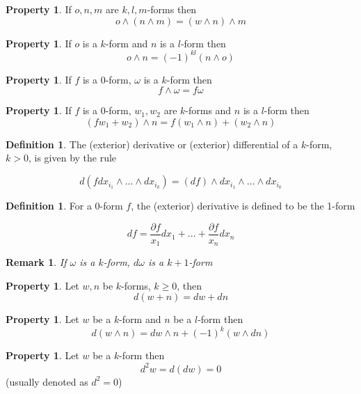\documentclass[12pt]{article}
\theoremstyle{plain}
\newtheorem*{remark}{Remark}
\theoremstyle{definition}
\newtheorem{definition}[theorem]{Definition}
\newtheorem{property}[theorem]{Property}
\begin{document}
\begin{property}
    If $o,n,m$ are $k,l,m$-forms then
    $$o\wedge(n\wedge m) = (w\wedge n) \wedge m$$
\end{property}

\begin{property}
    If $o$ is a $k$-form and $n$ is a $l$-form then
    $$o \wedge n = (-1)^{kl} (n\wedge o)$$
\end{property}

\begin{property}
    If $f$ is a 0-form, $\omega$ is a $k$-form then
    $$f\wedge \omega = f\omega$$
\end{property}

\begin{property}
    If $f$ is a 0-form, $w_1, w_2$ are $k$-forms and $n$ is a $l$-form then
    $$(fw_1 + w_2)\wedge n = f(w_1 \wedge n) + (w_2 \wedge n)$$
\end{property}

\begin{definition}
    The (exterior) derivative or (exterior) differential of a $k$-form, $k > 0$, is given by the rule

    $$d(fdx_{i_1} \wedge ... \wedge dx_{i_k}) = (df)\wedge dx_{i_1} \wedge ... \wedge dx_{i_k}$$
\end{definition}

\begin{definition}
    For a 0-form $f$, the (exterior) derivative is defined to be the 1-form

    $$df = \frac{\partial f}{x_1}dx_1 + ... + \frac{\partial f}{x_n}dx_n$$
\end{definition}

\begin{remark}
    If $\omega$ is a $k$-form, $d\omega$ is a $k+1$-form
\end{remark}

\begin{property}
    Let $w,n$ be $k$-forms, $k\geq 0$, then
    $$d(w + n) = dw + dn$$
\end{property}

\begin{property}
    Let $w$ be a $k$-form and $n$ be a $l$-form then
    $$d(w \wedge n) = dw \wedge n + (-1)^k (w \wedge dn)$$
\end{property}

\begin{property}
    Let $w$ be a $k$-form then
    $$d^2 w = d(dw) = 0$$
    (usually denoted as $d^2 = 0$)
\end{property}
\end{document}

